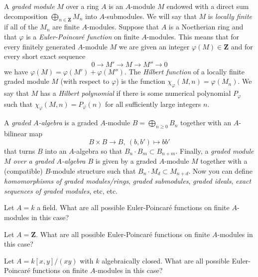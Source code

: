 \begin{definition}
\label{definition-graded-module}
A {\it graded module} $M$ over a ring $A$ is an $A$-module $M$
endowed with a direct sum decomposition
$
\bigoplus\nolimits_{n \in {\mathbf Z}} M_n
$
into $A$-submodules. We will say that $M$ is {\it locally finite} if all of
the $M_n$ are finite $A$-modules. Suppose that $A$ is a Noetherian ring and
that $\varphi$ is a {\it Euler-Poincar\'e function} on finite $A$-modules.
This means that for every finitely generated $A$-module $M$ we are given an
integer $\varphi(M) \in {\mathbf Z}$ and for every short exact sequence
$$
0
\longrightarrow
M'
\longrightarrow
M
\longrightarrow
M''
\longrightarrow
0
$$
we have $\varphi(M) = \varphi(M') + \varphi(M'')$. The {\it Hilbert function}
of a locally finite graded module $M$ (with respect to $\varphi$) is the
function $\chi_\varphi(M, n) = \varphi(M_n)$. We say that $M$ has a
{\it Hilbert polynomial} if there is some numerical polynomial
$P_\varphi$ such that $\chi_\varphi(M, n) = P_\varphi(n)$ for all sufficiently
large integers $n$.
\end{definition}

\begin{definition}
\label{definition-graded-algebra}
A {\it graded $A$-algebra} is a graded $A$-module
$B = \bigoplus_{n \geq 0} B_n$ together with an $A$-bilinear map
$$
B \times B \longrightarrow B, \ (b, b') \longmapsto bb'
$$
that turns $B$ into an $A$-algebra so that $B_n \cdot B_m \subset B_{n + m}$.
Finally, a {\it graded module $M$ over a graded $A$-algebra $B$} is given
by a graded $A$-module $M$ together with a (compatible) $B$-module structure
such that $B_n \cdot M_d \subset M_{n + d}$. Now you can define
{\it homomorphisms of graded modules/rings}, {\it graded submodules},
{\it graded ideals}, {\it exact sequences of graded modules}, etc, etc.
\end{definition}

\begin{exercise}
\label{exercise-Euler-Poincare-field}
Let $A = k$ a field. What are all possible Euler-Poincar\'e functions
on finite $A$-modules in this case?
\end{exercise}

\begin{exercise}
\label{exercise-Euler-Poincare-Z}
Let $A ={\mathbf Z}$. What are all possible Euler-Poincar\'e functions
on finite $A$-modules in this case?
\end{exercise}

\begin{exercise}
\label{exercise-Euler-Poincare-node}
Let $A = k[x, y]/(xy)$ with $k$ algebraically closed. What are all
possible Euler-Poincar\'e functions on finite $A$-modules in this case?
\end{exercise}

